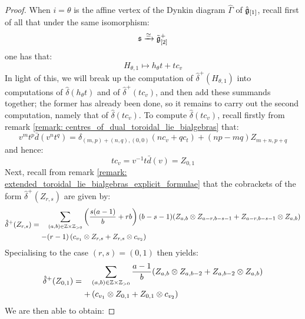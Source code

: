 \begin{proof}
                    When $i = \theta$ is the affine vertex of the Dynkin diagram $\hat{\Gamma}$ of $\hat{\mathfrak{g}}_{[1]}$, recall first of all that under the same isomorphism:
                        $$\mathfrak{s} \xrightarrow[]{\simeq} \tilde{\mathfrak{g}}_{[2]}^+$$
                    one has that:
                        $$H_{\theta, 1} \mapsto h_{\theta} t + t c_v$$
                    In light of this, we will break up the computation of $\hat{\delta}^+(H_{\theta, 1})$ into computations of $\hat{\delta}(h_{\theta} t)$ and of $\hat{\delta}^+(t c_v)$, and then add these summands together; the former has already been done, so it remains to carry out the second computation, namely that of $\hat{\delta}(t c_v)$. To compute $\hat{\delta}(t c_v)$, recall firstly from remark \ref{remark: centres_of_dual_toroidal_lie_bialgebras} that:
                        $$v^m t^p \bar{d}(v^n t^q) = \delta_{(m, p) + (n, q), (0, 0)} ( n c_v + q c_t ) + (np - mq) Z_{m + n, p + q}$$
                    and hence:
                        $$t c_v = v^{-1} t \bar{d}(v) = Z_{0, 1}$$
                    Next, recall from remark \ref{remark: extended_toroidal_lie_bialgebras_explicit_formulae} that the cobrackets of the form $\hat{\delta}^+(Z_{r, s})$ are given by:
                        $$
                            \hat{\delta}^+(Z_{r, s}) =
                            \begin{aligned}
                                & \sum_{(a, b) \in \Z \x \Z_{> 0}} \left( \frac{s(a - 1)}{b} + rb  \right) (b - s - 1) ( Z_{a, b} \tensor Z_{a - r, b - s - 1} + Z_{a - r, b - s - 1} \tensor Z_{a, b} )
                                \\
                                - & (r - 1) \left( c_{v_1} \tensor Z_{r, s} + Z_{r, s} \tensor c_{v_2} \right)
                            \end{aligned}
                        $$
                    Specialising to the case $(r, s) = (0, 1)$ then yields:
                        $$
                            \hat{\delta}^+(Z_{0, 1}) =
                            \begin{aligned}
                                & \sum_{(a, b) \in \Z \x \Z_{> 0}} \frac{a - 1}{b} ( Z_{a, b} \tensor Z_{a, b - 2} + Z_{a, b - 2} \tensor Z_{a, b} )
                                \\
                                + & \left( c_{v_1} \tensor Z_{0, 1} + Z_{0, 1} \tensor c_{v_2} \right)
                            \end{aligned}
                        $$
                    We are then able to obtain:

\end{proof}
